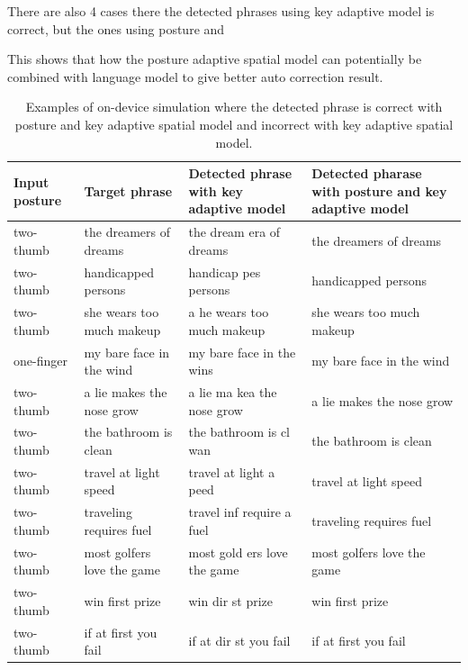 \documentclass{sigchi}
\newcommand\tabhead[1]{\small\textbf{#1}}
\begin{document}
There are also 4 cases there the detected phrases using key adaptive model is correct, but the ones
using posture and 

This shows that how the posture adaptive spatial model can potentially be combined 
with language model to give better auto correction result.

\begin{table}[tb]
  \centering
  \begin{tabularx}{0.925\textwidth}{|l|l|l|l|}
  \hline
  \tabhead{Input posture} & \tabhead{Target phrase} & \tabhead{Detected phrase with key adaptive model} 
  & \multicolumn{1}{|p{0.526\columnwidth}|}{\tabhead{Detected pharase with posture and key adaptive model}}\\
  \hline
  two-thumb & the dreamers of dreams & the {\color{red}dream era} of dreams & the dreamers of dreams  \\
  \hline
  two-thumb & handicapped persons & {\color{red}handicap pes} persons & handicapped persons \\
  \hline
  two-thumb & she wears too much makeup & {\color{red}a he} wears too much makeup & she wears too much makeup \\
  \hline
  one-finger & my bare face in the wind & my bare face in the {\color{red}wins} & my bare face in the wind \\ 
  \hline
  two-thumb & a lie makes the nose grow & a lie {\color{red}ma kea} the nose grow & a lie makes the nose grow \\
  \hline 
  two-thumb & the bathroom is clean & the bathroom is {\color{red}cl wan} & the bathroom is clean \\
  \hline 
  two-thumb & travel at light speed & travel at light {\color{red}a peed} & travel at light speed \\ 
  \hline
  two-thumb & traveling requires fuel & {\color{red}travel inf require a} fuel & traveling requires fuel \\
  \hline 
  two-thumb & most golfers love the game & most {\color{red}gold ers} love the game & most golfers love the game \\ 
  \hline
  two-thumb & win first prize & win {\color{red}dir st} prize & win first prize \\ 
  \hline
  two-thumb & if at first you fail & if at {\color{red}dir st} you fail & if at first you fail \\ 
  \hline
  \end{tabularx}
  \caption{Examples of on-device simulation where the detected phrase is correct
  with posture and key adaptive spatial model and incorrect with key adaptive spatial
  model.}
  \label{tab:on-device}
\end{table}
\end{document}
